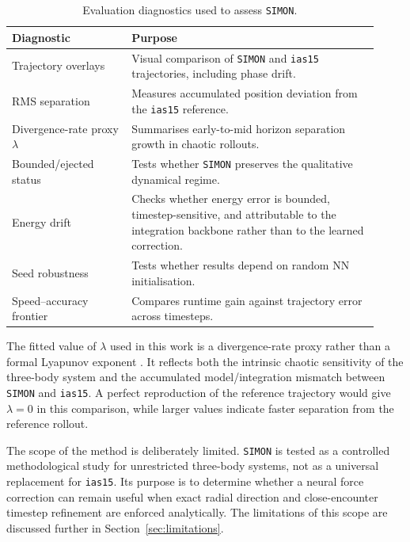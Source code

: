 \documentclass[12pt]{article}
\begin{document}
\begin{table}[H]
\centering
\caption{Evaluation diagnostics used to assess \texttt{SIMON}.}
\label{tab:evaluation_strategy}
\begin{tabular}{@{}p{0.30\linewidth}p{0.62\linewidth}@{}}
\toprule
\textbf{Diagnostic} & \textbf{Purpose} \\
\midrule
Trajectory overlays & Visual comparison of \texttt{SIMON} and \texttt{ias15} trajectories, including phase drift. \\
RMS separation & Measures accumulated position deviation from the \texttt{ias15} reference. \\
Divergence-rate proxy $\lambda$ & Summarises early-to-mid horizon separation growth in chaotic rollouts. \\
Bounded/ejected status & Tests whether \texttt{SIMON} preserves the qualitative dynamical regime. \\
Energy drift & Checks whether energy error is bounded, timestep-sensitive, and
attributable to the integration backbone rather than to the learned correction. \\
Seed robustness & Tests whether results depend on random NN initialisation. \\
Speed--accuracy frontier & Compares runtime gain against trajectory error across timesteps. \\
\bottomrule
\end{tabular}
\end{table}

The fitted value of $\lambda$ used in this work is a divergence-rate proxy rather than a
formal Lyapunov exponent \citep{sep-chaos}. It reflects both the intrinsic chaotic sensitivity
of the three-body system and the accumulated model/integration mismatch between
\texttt{SIMON} and \texttt{ias15}. A perfect reproduction of the reference trajectory would give
$\lambda=0$ in this comparison, while larger values indicate faster separation from the
reference rollout.

The scope of the method is deliberately limited. \texttt{SIMON} is tested as a controlled
methodological study for unrestricted three-body systems, not as a universal replacement for
\texttt{ias15}. Its purpose is to determine whether a neural force correction can remain useful
when exact radial direction and close-encounter timestep refinement are enforced analytically.
The limitations of this scope are discussed further in Section~\ref{sec:limitations}.

\end{document}
